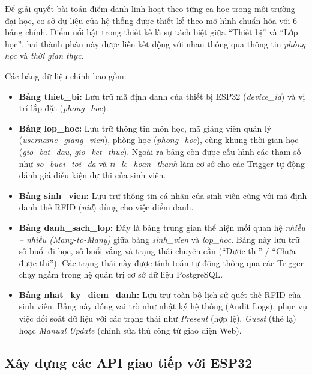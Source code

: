 \documentclass[12pt,a4paper]{report}
\begin{document}
Để giải quyết bài toán điểm danh linh hoạt theo từng ca học trong môi trường đại học, cơ sở dữ liệu của hệ thống được thiết kế theo mô hình chuẩn hóa với 6 bảng chính. Điểm nổi bật trong thiết kế là sự tách biệt giữa ``Thiết bị'' và ``Lớp học'', hai thành phần này được liên kết động với nhau thông qua thông tin \textit{phòng học} và \textit{thời gian thực}.

Các bảng dữ liệu chính bao gồm:

\begin{itemize}
\item \textbf{Bảng thiet\_bi:}  
Lưu trữ mã định danh của thiết bị ESP32 (\textit{device\_id}) và vị trí lắp đặt (\textit{phong\_hoc}).

\item \textbf{Bảng lop\_hoc:}  
Lưu trữ thông tin môn học, mã giảng viên quản lý (\textit{username\_giang\_vien}), phòng học (\textit{phong\_hoc}), cùng khung thời gian học (\textit{gio\_bat\_dau}, \textit{gio\_ket\_thuc}).  
Ngoài ra bảng còn được cấu hình các tham số như \textit{so\_buoi\_toi\_da} và \textit{ti\_le\_hoan\_thanh} làm cơ sở cho các Trigger tự động đánh giá điều kiện dự thi của sinh viên.

\item \textbf{Bảng sinh\_vien:}  
Lưu trữ thông tin cá nhân của sinh viên cùng với mã định danh thẻ RFID (\textit{uid}) dùng cho việc điểm danh.

\item \textbf{Bảng danh\_sach\_lop:}  
Đây là bảng trung gian thể hiện mối quan hệ \textit{nhiều -- nhiều (Many-to-Many)} giữa bảng \textit{sinh\_vien} và \textit{lop\_hoc}.  
Bảng này lưu trữ số buổi đi học, số buổi vắng và trạng thái chuyên cần (``Được thi'' / ``Chưa được thi''). Các trạng thái này được tính toán tự động thông qua các Trigger chạy ngầm trong hệ quản trị cơ sở dữ liệu PostgreSQL.

\item \textbf{Bảng nhat\_ky\_diem\_danh:}  
Lưu trữ toàn bộ lịch sử quét thẻ RFID của sinh viên. Bảng này đóng vai trò như nhật ký hệ thống (Audit Logs), phục vụ việc đối soát dữ liệu với các trạng thái như \textit{Present} (hợp lệ), \textit{Guest} (thẻ lạ) hoặc \textit{Manual Update} (chỉnh sửa thủ công từ giao diện Web).
\end{itemize}

\subsection{Xây dựng các API giao tiếp với ESP32}
\end{document}
